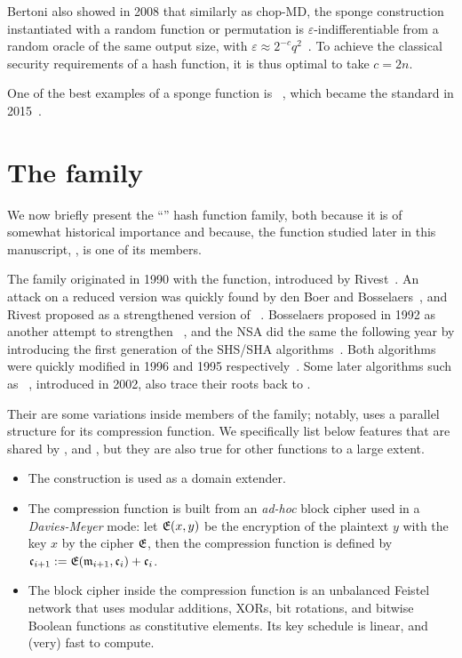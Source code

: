 Bertoni \etal also showed in 2008 that similarly as chop-MD, the sponge construction instantiated with a random function or permutation is $\varepsilon$-indifferentiable from a random oracle
of the same output size, with $\varepsilon \approx 2^{-c}q^2$~\cite{DBLP:conf/eurocrypt/BertoniDPA08}. To achieve the classical security requirements of a hash function, it is thus optimal to take $c = 2n$.

One of the best examples of a sponge function is \keccak~\cite{KeccakReference}, which became the \shathree standard in 2015~\cite{Nist-SHA3}. 

\section{The \mdsha family}
\label{sec:mdsha}
We now briefly present the ``\mdsha'' hash function family, both because it is of somewhat historical importance and because, the function studied later in this manuscript, \shaone, is one of its members.

The family originated in 1990 with the \mdfour function, introduced by Rivest~\cite{Rivest-md4}. An attack on a reduced version was quickly found by den Boer and Bosselaers~\cite{DBLP:conf/crypto/BoerB91},
and Rivest proposed \mdfive as a strengthened version of \mdfour~\cite{Rivest-md5}. Bosselaers proposed \ripemd in 1992 as another attempt to strengthen \mdfour~\cite[Chap. 3]{DBLP:books/sp/BosselaersP95},
and the NSA did the same the following year by introducing the first generation of the SHS/SHA algorithms~\cite{Nist-SHA0}. Both algorithms were quickly modified in 1996 and 1995 respectively~\cite{DBLP:conf/fse/DobbertinBP96,Nist-SHA1}.
Some later algorithms such as \shatwo~\cite{Nist-SHA}, introduced in 2002, also trace their roots back to \mdfour.

Their are some variations inside members of the family; notably, \ripemd uses a parallel structure for its compression function. We specifically list below features that are shared by \mdfour, \mdfive and \sha, but they are also
true for other \mdsha functions to a large extent.
\begin{itemize}
\item The \merkdam construction is used as a domain extender.
\item The compression function is built from an \emph{ad-hoc} block cipher used in a \emph{Davies-Meyer} mode: let $\operatorname{\mathfrak{E}}(x,y)$ be the encryption of the plaintext $y$ with the key $x$ by the cipher $\operatorname{\mathfrak{E}}$, then
the compression function is defined by
$\mathfrak{c}_{i+1} := \operatorname{\mathfrak{E}}(\mathfrak{m}_{i+1},\mathfrak{c}_i) + \mathfrak{c}_i$.
\item The block cipher inside the compression function is an unbalanced Feistel network that uses modular additions, XORs, bit rotations, and bitwise Boolean functions as constitutive elements. Its key schedule is linear, and (very) fast to compute. 
\end{itemize}

